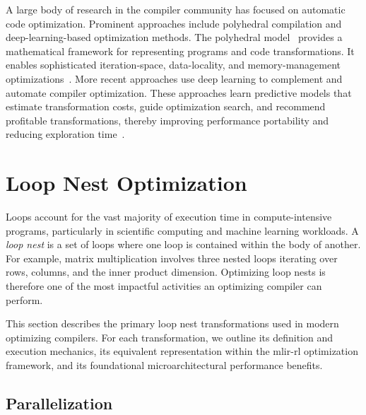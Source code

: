 A large body of research in the compiler community has focused on automatic code optimization. Prominent approaches include polyhedral compilation and deep-learning-based optimization methods.
The polyhedral model~\cite{Feautrier2011} provides a mathematical framework for representing programs and code transformations. It enables sophisticated iteration-space, data-locality, and memory-management optimizations~\cite{Iri88,feautrier_array_1988,wolf1991loop,lefebvre_automatic_1998,Qui00,thies_unified_2001,Darte_contraction_2005,bondhugula_practical_2008, baghdadi2015PhD,baghdadi2019tiramisu,baghdadi2018tiramisu1,trifunovic_graphite_2010,polly,tobias_hexagonal_cgo13,Vasilache2018TensorCF,baghdadi2011speculation,merouani2020deep, pouchet.11.popl,baghdadi2020tiramisuDNNDenseSparse}. More recent approaches use deep learning to complement and automate compiler optimization. These approaches learn predictive models that estimate transformation costs, guide optimization search, and recommend profitable transformations, thereby improving performance portability and reducing exploration time~\cite{adams2019learning,baghdadi2021deep,merouani2020deep,chen2018learning,zheng2020ansor,mendis2019ithemal,polygym,merouani2024looper,hakimi2023hybrid,mezdour2023deep,mlirlr,pearl,compilot,autophase2019,mlgo,compilergym,felix,looper_data_arxiv25,predictivepolyhedral,huanting2022ss,rl_hsl}.


\section{Loop Nest Optimization}

Loops account for the vast majority of execution time in compute-intensive programs, particularly in scientific computing and machine learning workloads. A \textit{loop nest} is a set of loops where one loop is contained within the body of another. For example, matrix multiplication involves three nested loops iterating over rows, columns, and the inner product dimension. Optimizing loop nests is therefore one of the most impactful activities an optimizing compiler can perform.

This section describes the primary loop nest transformations used in modern optimizing compilers. For each transformation, we outline its definition and execution mechanics, its equivalent representation within the \gls{mlir}-\gls{rl} optimization framework, and its foundational microarchitectural performance benefits.

\subsection{Parallelization}

